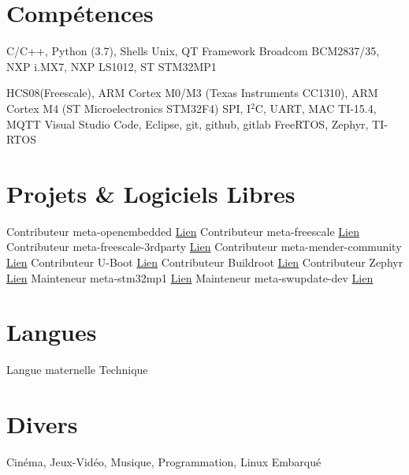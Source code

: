 \documentclass[9pts,a4paper,sans]{moderncv}
\begin{document}
\section{Compétences}
 {C/C++, Python (3.7), Shells Unix, QT Framework} 
 {Broadcom BCM2837/35, NXP i.MX7, NXP LS1012, ST STM32MP1}

 {HCS08(Freescale), ARM Cortex M0/M3 (Texas Instruments CC1310), ARM Cortex M4 (ST Microelectronics STM32F4)}
 {SPI, I$^{2}$C, UART, MAC TI-15.4, MQTT} 
 {Visual Studio Code, Eclipse, git, github, gitlab }
 {FreeRTOS, Zephyr, TI-RTOS}

\section{Projets \& Logiciels Libres}
\cventry{} {Contributeur} {meta-openembedded} {} {\href{https://github.com/openembedded/meta-openembedded/commits?author=jorisoffouga}{Lien}} {}
\cventry{} {Contributeur} {meta-freescale} {} {\href{https://github.com/Freescale/meta-freescale/commits?author=jorisoffouga}{Lien}} {}
\cventry{} {Contributeur} {meta-freescale-3rdparty} {} {\href{https://github.com/Freescale/meta-freescale-3rdparty/commits?author=jorisoffouga}{Lien}} {}
\cventry{} {Contributeur} {meta-mender-community} {} {\href{https://github.com/mendersoftware/meta-mender-community/commits?author=jorisoffouga}{Lien}} {}
\cventry{} {Contributeur} {U-Boot} {} {\href{https://github.com/trini/u-boot/commits?author=jorisoffouga}{Lien}} {}
\cventry{} {Contributeur} {Buildroot} {} {\href{https://github.com/buildroot/buildroot/commits?author=jorisoffouga}{Lien}} {}
\cventry{} {Contributeur} {Zephyr} {} {\href{https://github.com/zephyrproject-rtos/zephyr/commits?author=jorisoffouga}{Lien}}{}
\cventry{} {Mainteneur} {meta-stm32mp1} {} {\href{https://github.com/bdx-iot/meta-stm32mp1/commits?author=jorisoffouga}{Lien}} {}
\cventry{} {Mainteneur} {meta-swupdate-dev} {} {\href{https://github.com/bdx-iot/meta-swupdate-dev/commits?author=jorisoffouga}{Lien}} {}

\section{Langues}
 {Langue maternelle}
 {Technique}
 
\section{Divers}
 {Cinéma, Jeux-Vidéo, Musique, Programmation, Linux Embarqué}
\end{document}
